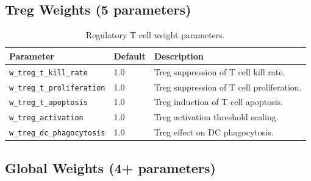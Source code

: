 \subsection{Treg Weights (5 parameters)}

\begin{table}[H]
\centering
\caption{Regulatory T cell weight parameters.}
\label{tab:treg-weights}
\begin{tabular}{@{}llp{5.5cm}@{}}
\toprule
\textbf{Parameter} & \textbf{Default} & \textbf{Description} \\
\midrule
\texttt{w\_treg\_t\_kill\_rate} & 1.0 & Treg suppression of T cell kill rate. \\
\texttt{w\_treg\_t\_proliferation} & 1.0 & Treg suppression of T cell proliferation. \\
\texttt{w\_treg\_t\_apoptosis} & 1.0 & Treg induction of T cell apoptosis. \\
\texttt{w\_treg\_activation} & 1.0 & Treg activation threshold scaling. \\
\texttt{w\_treg\_dc\_phagocytosis} & 1.0 & Treg effect on DC phagocytosis. \\
\bottomrule
\end{tabular}
\end{table}

\subsection{Global Weights (4+ parameters)}

